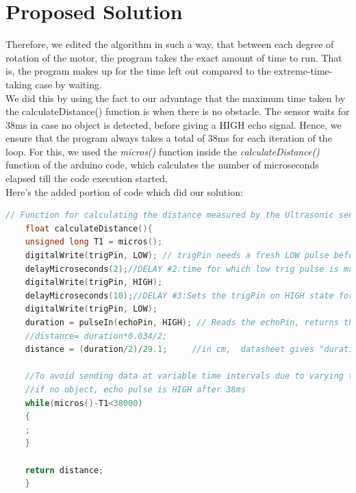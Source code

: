 \section{Proposed Solution}
Therefore, we edited the algorithm in such a way, that between each degree of rotation of the motor, the program takes the exact amount of time to run. That is, the program makes up for the time left out compared to the extreme-time-taking case by waiting.\\
We did this by using the fact to our advantage that the maximum time taken by the calculateDistance() function is when there is no obstacle. The \hcsr{} sensor waits for 38ms in case no object is detected, before giving a HIGH echo signal. Hence, we ensure that the program always takes a total of 38ms for each iteration of the loop. For this, we used the \emph{micros()} function inside the \textit{calculateDistance()} function of the arduino code, which calculates the number of microseconds elapsed till the code execution started.\\
Here's the added portion of code which did our solution:
\begin{mdframed}[backgroundcolor=light-gray, roundcorner=10pt,leftmargin=1, rightmargin=1, innerleftmargin=15, innertopmargin=15,innerbottommargin=15, outerlinewidth=1, linecolor=light-gray]
	\begin{lstlisting}[caption={Corrected calculateDistance() function},language = C]
	// Function for calculating the distance measured by the Ultrasonic sensor
	float calculateDistance(){ 
	unsigned long T1 = micros();
	digitalWrite(trigPin, LOW); // trigPin needs a fresh LOW pulse before sending a HIGH pulse that can be detected from echoPin
	delayMicroseconds(2);//DELAY #2:time for which low trig pulse is maintained before making it high
	digitalWrite(trigPin, HIGH); 
	delayMicroseconds(10);//DELAY #3:Sets the trigPin on HIGH state for 10 micro seconds
	digitalWrite(trigPin, LOW);
	duration = pulseIn(echoPin, HIGH); // Reads the echoPin, returns the sound wave travel time in microseconds
	//distance= duration*0.034/2;
	distance = (duration/2)/29.1;     //in cm,  datasheet gives "duration/58" as the formula
	
	//To avoid sending data at variable time intervals due to varying time duration taken between execution of above code inside this function depending on distance of obstacle
	//if no object, echo pulse is HIGH after 38ms
	while(micros()-T1<38000)
	{
	;
	}
	
	return distance;
	}
	\end{lstlisting}
	\end{mdframed}
